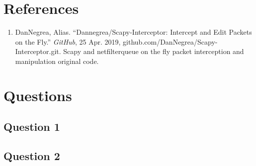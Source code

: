 \section{References}
\begin{enumerate}
    \item[] DanNegrea, Alias. “Dannegrea/Scapy-Interceptor: Intercept and Edit Packets on the Fly.” \textit{GitHub}, 25 Apr. 2019, github.com/DanNegrea/Scapy-Interceptor.git. Scapy and netfilterqueue on the fly packet interception and manipulation original code.
\end{enumerate}

\section{Questions}
\subsection{Question 1}
\paragraph{}
\subsection{Question 2}
\paragraph{}